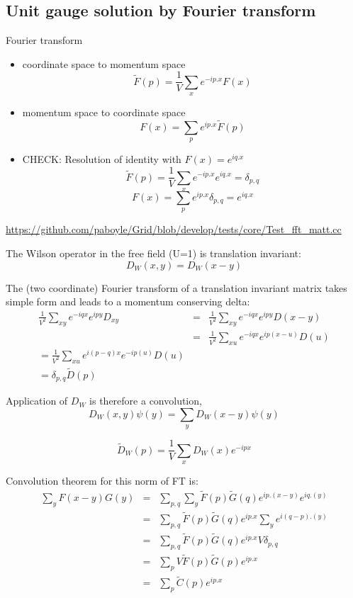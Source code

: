 \documentclass[letter,10pt]{report}
\begin{document}
\subsection{Unit gauge solution by Fourier transform}

Fourier transform

\begin{itemize}
\item coordinate space to momentum space
  $$
  \tilde{F}(p) = \frac{1}{V}\sum_x e^{-i p.x} F(x)
  $$
  \item momentum space to coordinate space
  $$
  F(x)=  \sum_p e^{i p.x} \tilde{F}(p)
  $$
\item CHECK: Resolution of identity with $F(x) = e^{i q.x}$
  $$
  \tilde{F}(p) = \frac{1}{V} \sum_x e^{-i p.x} e^{i q.x} = \delta_{p,q} 
  $$
  $$
  F(x)=  \sum_p e^{i p.x} \delta_{p,q} = e^{i q.x}
  $$
\end{itemize}

\href{https://github.com/paboyle/Grid/blob/develop/tests/core/Test\_fft\_matt.cc}{https://github.com/paboyle/Grid/blob/develop/tests/core/Test\_fft\_matt.cc}

The Wilson operator in the free field (U=1) is translation invariant: $$D_W(x,y) = D_W(x-y)$$

The (two coordinate) Fourier transform of a translation invariant matrix takes simple form and leads to a momentum conserving delta:
\begin{eqnarray}
 \frac{1}{V^2} \sum_{xy}  e^{-iqx} e^{ipy} D_{xy}
 &=&  
\frac{1}{V^2} \sum_{xy}  e^{-iqx} e^{ipy} D(x-y)\\
 &=& \frac{1}{V^2} \sum_{xu} e^{-iqx} e^{ip(x-u)} D(u)\\
= \frac{1}{V^2} \sum_{xu} e^{i(p-q)x} e^{-ip(u)} D(u)\\
= \delta_{p,q} \tilde{D}(p)
\end{eqnarray}

Application of $D_W$ is therefore a convolution,
$$
D_W(x,y) \psi(y) = \sum_y D_W(x-y) \psi(y)
$$

$$
\tilde{D}_W(p) = \frac{1}{V} \sum_x D_W(x) e^{-ipx}
$$

Convolution theorem for this norm of FT is:
\begin{eqnarray}
  \sum_y F(x-y) G(y)
&=&
 \sum_{p,q}  \sum_y\tilde{F}(p) \tilde{G}(q)e^{i p.(x-y)}e^{i q.(y)}\\
&=&
 \sum_{p,q}  \tilde{F}(p) \tilde{G}(q)e^{i p.x} \sum_y e^{i (q-p).(y)}\\
&=&
 \sum_{p,q}  \tilde{F}(p) \tilde{G}(q)e^{i p.x} V \delta_{p,q}\\
&=&
 \sum_{p}  V \tilde{F}(p) \tilde{G}(p) e^{i p.x} \\
&=&
 \sum_{p}  \tilde{C}(p) e^{i p.x} 
\end{eqnarray}
\end{document}
